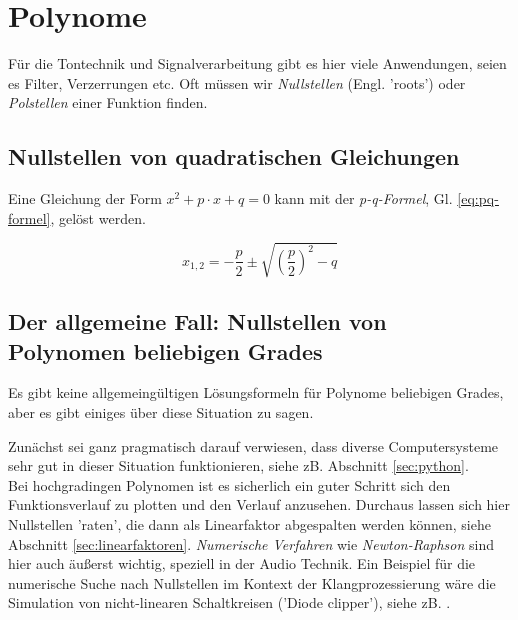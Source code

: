 \section{Polynome}


Für die Tontechnik und Signalverarbeitung gibt es hier viele Anwendungen, seien es Filter, Verzerrungen etc. Oft müssen wir \emph{Nullstellen} (Engl. 'roots') oder \emph{Polstellen} einer Funktion finden. 

\subsection{Nullstellen von quadratischen Gleichungen}

Eine Gleichung der Form $x^2 + p \cdot x + q = 0$ kann mit der \emph{p-q-Formel}, Gl. \ref{eq:pq-formel}, gelöst werden.


\begin{equation}
x_{1,2} = -\frac{p}{2} \pm \sqrt{\left( \frac{p}{2} \right)^2 - q } \label{eq:pq-formel}
\end{equation}

\subsection{Der allgemeine Fall: Nullstellen von Polynomen beliebigen Grades}
Es gibt keine allgemeingültigen Lösungsformeln für Polynome beliebigen Grades, aber es gibt einiges über diese Situation zu sagen.



Zunächst sei ganz pragmatisch darauf verwiesen, dass diverse Computersysteme sehr gut in dieser Situation funktionieren, siehe zB. Abschnitt \ref{sec:python}. \\
Bei hochgradingen Polynomen ist es sicherlich ein guter Schritt sich den Funktionsverlauf zu plotten und den Verlauf anzusehen. Durchaus lassen sich hier Nullstellen 'raten', die dann als Linearfaktor abgespalten werden können, siehe Abschnitt \ref{sec:linearfaktoren}. \emph{Numerische Verfahren} wie \emph{Newton-Raphson} sind hier auch äußerst wichtig, speziell in der Audio Technik. Ein Beispiel für die numerische Suche nach Nullstellen im Kontext der Klangprozessierung wäre die Simulation von nicht-linearen Schaltkreisen ('Diode clipper'), siehe zB. \cite{holmes2015improving}. \\

